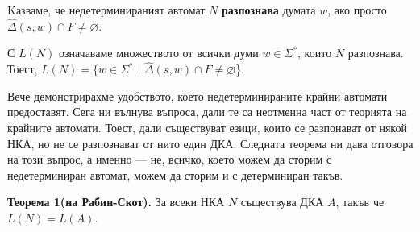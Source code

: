 \documentclass{article}
\begin{document}
    Kазваме, че недетерминираният автомат $N$ \textbf{разпознава} думата $w$, ако просто
    $\hat{\Delta}(s,w) \cap F \neq \varnothing$.

    \vspace{5pt}

    С $L(N)$ означаваме множеството от всички думи $w \in \Sigma^*$, които $N$ разпознава.
    Тоест, $L(N) = \{w \in \Sigma^*$ | $\hat{\Delta}(s,w) \cap F \neq \varnothing$\}.

    \vspace{15pt}

    Вече демонстрирахме удобството, което недетерминираните крайни автомати предоставят.
    Сега ни вълнува въпроса, дали те са неотменна част от теорията на крайните автомати.
    Тоест, дали съществуват езици, които се разпонават от някой НКА, но не се разпознават
    от нито един ДКА. Следната теорема ни дава отговора на този въпрос, а именно — не,
    всичко, което можем да сторим с недетерминиран автомат, можем да сторим и с детерминиран
    такъв.

    \vspace{15pt}

    \textbf{Теорема 1(на Рабин-Скот).} За всеки НКА $N$ съществува ДКА $A$, такъв че
    $L(N) = L(A)$.

    \vspace{15pt}
\end{document}
